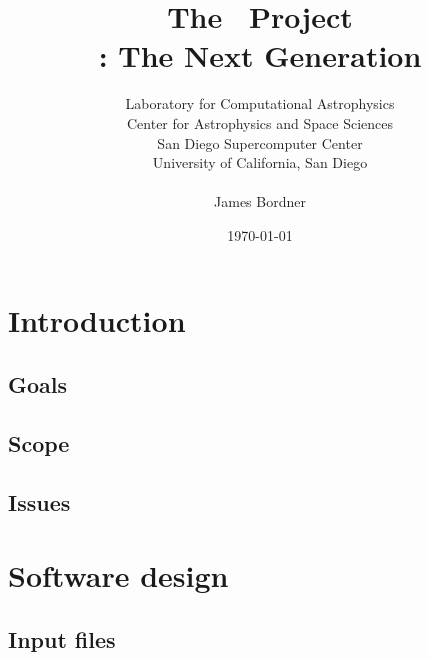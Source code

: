 \documentclass{beamer}
\title[The \cello\ Project]
      {The \cello\ Project \\ \small{\enzo: The Next Generation}}
\author[James Bordner]{\small Laboratory for Computational Astrophysics \\ Center for Astrophysics and Space Sciences \\San Diego Supercomputer Center \\ University of California, San Diego \\ \ \\ James Bordner}
\date{\today}
\begin{document}
\frame{\titlepage}
{
}

\section{Introduction}

% 

\subsection{Goals}



\subsection{Scope}




\subsection{Issues}



\section{Software design}

\subsection{Input files}
\end{document}
